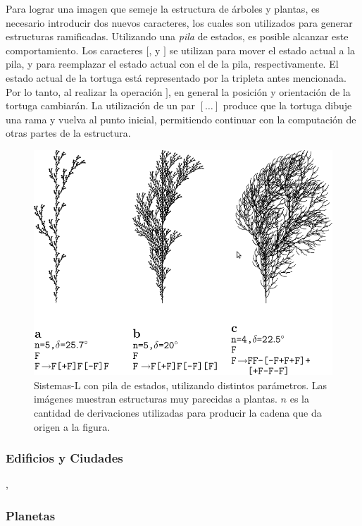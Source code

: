 Para lograr una imagen que semeje la estructura de árboles y plantas, es necesario introducir dos nuevos caracteres, los cuales son utilizados para generar estructuras ramificadas.
Utilizando una {\em pila} de estados, es posible alcanzar este comportamiento.
Los caracteres $[$, y $]$ se utilizan para mover el estado actual a la pila, y para reemplazar el estado actual con el de la pila, respectivamente.
El estado actual de la tortuga está representado por la tripleta antes mencionada.
Por lo tanto, al realizar la operación $]$, en general la posición y orientación de la tortuga cambiarán.
La utilización de un par $[\dots]$ produce que la tortuga dibuje una rama y vuelva al punto inicial, permitiendo continuar con la computación de otras partes de la estructura.

\begin{figure}
\center
\includegraphics[width=13cm]{figures/sistemalcorchete}
\caption{Sistemas-L con pila de estados, utilizando distintos parámetros. Las imágenes muestran estructuras muy parecidas a plantas. $n$ es la cantidad de derivaciones utilizadas para producir la cadena que da origen a la figura.}
\label{fg:sistemasLcorchete}
\end{figure}

\subsubsection{Edificios y Ciudades}
\cite{Parish2001} \cite{Muller2006},
\subsubsection{Planetas}
\cite{Ebert2002}

